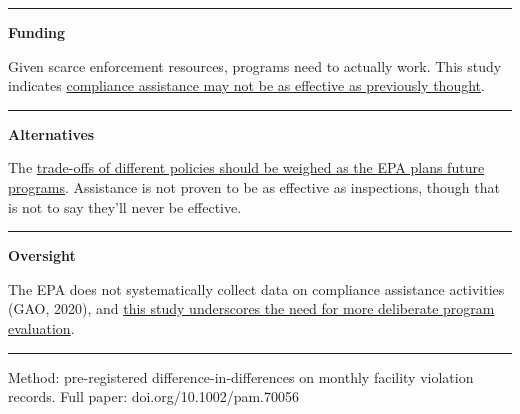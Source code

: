 \documentclass[
  10pt,
]{article}
\newcommand{\impcolsize}{\color{muted}\fontsize{8.25pt}{11.7pt}\selectfont}
\newcommand{\sectionhead}[1]{%
  \vspace{2pt}{\color{ink}\bfseries\fontsize{9.75pt}{12pt}\selectfont
  \textls[20]{\MakeUppercase{#1}}\par}\vspace{1pt}}
\newcommand{\colhead}[1]{%
  \noindent\textcolor{ink}{\rule{\linewidth}{1.5pt}}\par\vspace{2pt}%
  {\color{ink}\bfseries\fontsize{9pt}{11pt}\selectfont #1\par}\vspace{1pt}}
\newcommand{\brieflink}[1]{{\color{accentred}\ul{#1}}}
\newcommand{\brieffooter}[1]{%
  \par\vfill
  \noindent\textcolor{warmrule}{\rule{\linewidth}{0.7pt}}\par\vspace{5pt}%
  {\color{faint}\fontsize{7.1pt}{9.5pt}\selectfont #1\par}}
\begin{document}
\vspace{0pt}

\sectionhead{Implications}

\noindent
\begin{minipage}[t]{0.310\linewidth}
\colhead{Funding}
{\impcolsize Given scarce enforcement resources, programs need to actually work. This study indicates \brieflink{compliance assistance may not be as effective as previously thought}.\par}
\end{minipage}\hfill
\begin{minipage}[t]{0.310\linewidth}
\colhead{Alternatives}
{\impcolsize The \brieflink{trade-offs of different policies should be weighed as the EPA plans future programs}. Assistance is not proven to be as effective as inspections, though that is not to say they'll never be effective.\par}
\end{minipage}\hfill
\begin{minipage}[t]{0.310\linewidth}
\colhead{Oversight}
{\impcolsize The EPA does not systematically collect data on compliance assistance activities (GAO, 2020), and \brieflink{this study underscores the need for more deliberate program evaluation}.\par}
\end{minipage}

\brieffooter{Method: pre-registered difference-in-differences on monthly facility violation records. Full paper: doi.org/10.1002/pam.70056}
\end{document}
